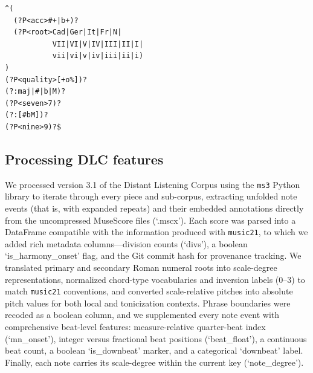 \documentclass[sigconf]{acmart} %
\begin{document}


\begin{listing}
    \begin{verbatim}
^(
  (?P<acc>#+|b+)?
  (?P<root>Cad|Ger|It|Fr|N|
           VII|VI|V|IV|III|II|I|
           vii|vi|v|iv|iii|ii|i)
)
(?P<quality>[+o%])?
(?:maj|#|b|M)?
(?P<seven>7)?
(?:[#bM])?
(?P<nine>9)?$
    \end{verbatim}
    \caption{Regular expression of the simple Roman Numeral}
    \label{lst:rn_regex}
\end{listing}

\subsection{Processing DLC features}

We processed version 3.1 of the Distant Listening Corpus using the \texttt{ms3} Python library to iterate through every piece and sub-corpus, extracting unfolded note events (that is, with expanded repeats) and their embedded annotations directly from the uncompressed MuseScore files (`.mscx'). Each score was parsed into a DataFrame compatible with the information produced with \texttt{music21}, to which we added rich metadata columns---division counts (`divs'), a boolean `is\_harmony\_onset' flag, and the Git commit hash for provenance tracking. We translated primary and secondary Roman numeral roots into scale-degree representations, normalized chord-type vocabularies and inversion labels (0–3) to match \texttt{music21} conventions, and converted scale-relative pitches into absolute pitch values for both local and tonicization contexts. Phrase boundaries were recoded as a boolean column, and we supplemented every note event with comprehensive beat-level features: measure-relative quarter-beat index (`mn\_onset'), integer versus fractional beat positions (`beat\_float'), a continuous beat count, a boolean `is\_downbeat' marker, and a categorical `downbeat' label. Finally, each note carries its scale-degree within the current key (`note\_degree').
\end{document}
